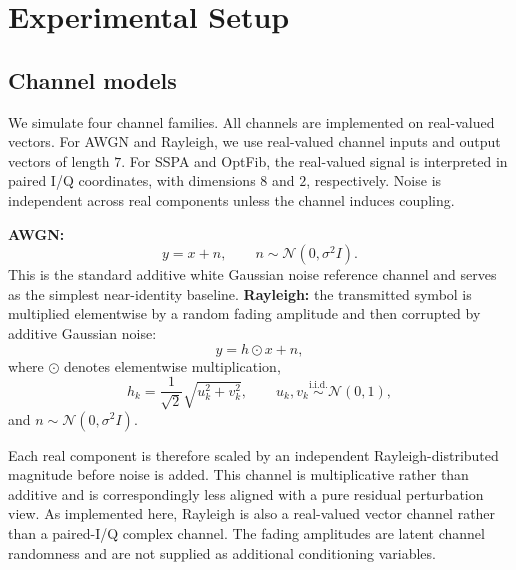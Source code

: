 \documentclass[conference]{IEEEtran}
\begin{document}

\section{Experimental Setup}
\subsection{Channel models}
We simulate four channel families. All channels are implemented on real-valued vectors.
For AWGN and Rayleigh, we use real-valued channel inputs and output vectors of length \(7\).
For SSPA and OptFib, the real-valued signal is interpreted in paired I/Q coordinates, with dimensions \(8\) and \(2\), respectively.
Noise is independent across real components unless the channel induces coupling.

\textbf{AWGN:}
\begin{equation}
y = x + n,
\qquad
n \sim \mathcal{N}(0,\sigma^2 I).
\end{equation}
This is the standard additive white Gaussian noise reference channel and serves as the simplest near-identity baseline.
\textbf{Rayleigh:}
the transmitted symbol is multiplied elementwise by a random fading amplitude and then corrupted by additive Gaussian noise:
\begin{equation}
y = h \odot x + n,
\end{equation}
where \(\odot\) denotes elementwise multiplication,
\begin{equation}
h_k = \frac{1}{\sqrt{2}}\sqrt{u_k^2 + v_k^2},
\qquad
u_k,v_k \overset{\text{i.i.d.}}{\sim} \mathcal{N}(0,1),
\end{equation}
and $n \sim \mathcal{N}(0,\sigma^2 I).$

Each real component is therefore scaled by an independent Rayleigh-distributed magnitude before noise is added.
This channel is multiplicative rather than additive and is correspondingly less aligned with a pure residual perturbation view.
As implemented here, Rayleigh is also a real-valued vector channel rather than a paired-I/Q complex channel.
The fading amplitudes are latent channel randomness and are not supplied as additional conditioning variables.
\end{document}
